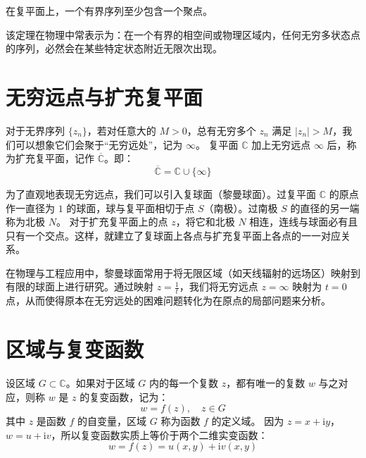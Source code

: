 \begin{theorem}
在复平面上，一个有界序列至少包含一个聚点。
\end{theorem}
\begin{remark}
该定理在物理中常表示为：在一个有界的相空间或物理区域内，任何无穷多状态点的序列，必然会在某些特定状态附近无限次出现。
\end{remark}

\section{无穷远点与扩充复平面}

\begin{definition}[无穷远点与扩充复平面]
对于无界序列 \(\{z_n\}\)，若对任意大的 \(M > 0\)，总有无穷多个 \(z_n\) 满足 \(|z_n| > M\)，我们可以想象它们会聚于“无穷远处”，记为 \(\infty\)。
复平面 \(\mathbb{C}\) 加上无穷远点 \(\infty\) 后，称为扩充复平面，记作 \(\overline{\mathbb{C}}\)。即：
\[
\overline{\mathbb{C}} = \mathbb{C} \cup \{\infty\}
\]
\end{definition}

\begin{definition}
为了直观地表现无穷远点，我们可以引入复球面（黎曼球面）。过复平面 \(\mathbb{C}\) 的原点作一直径为 \(1\) 的球面，球与复平面相切于点 \(S\)（南极）。过南极 \(S\) 的直径的另一端称为北极 \(N\)。
对于扩充复平面上的点 \(z\)，将它和北极 \(N\) 相连，连线与球面必有且只有一个交点。这样，就建立了复球面上各点与扩充复平面上各点的一一对应关系。
\end{definition}

\begin{remark}
在物理与工程应用中，黎曼球面常用于将无限区域（如天线辐射的远场区）映射到有限的球面上进行研究。通过映射 \(z = \frac{1}{t}\)，我们将无穷远点 \(z = \infty\) 映射为 \(t = 0\) 点，从而使得原本在无穷远处的困难问题转化为在原点的局部问题来分析。
\end{remark}

\section{区域与复变函数}

\begin{definition}[复变函数]
设区域 \(G \subset \mathbb{C}\)。如果对于区域 \(G\) 内的每一个复数 \(z\)，都有唯一的复数 \(w\) 与之对应，则称 \(w\) 是 \(z\) 的复变函数，记为：
\[
w = f(z), \quad z \in G
\]
其中 \(z\) 是函数 \(f\) 的自变量，区域 \(G\) 称为函数 \(f\) 的定义域。
因为 \(z = x + \mathrm{i}y\)，\(w = u + \mathrm{i}v\)，所以复变函数实质上等价于两个二维实变函数：
\[
w = f(z) = u(x, y) + \mathrm{i} v(x, y)
\]
\end{definition}

